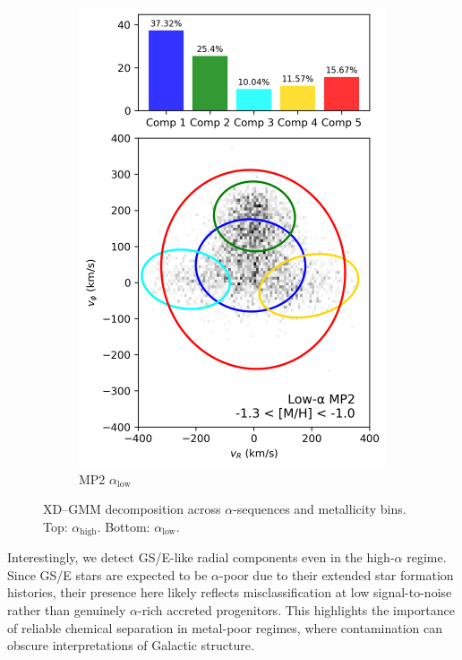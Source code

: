\documentclass[a4paper,10pt]{article}
\begin{document}
\begin{multicols}{2}
\begin{figure}[H]
\begin{subfigure}[t]{0.24\linewidth}
    \includegraphics[width=\linewidth]{../figures/gmm_mp2_low_alpha_k6.png}
    \caption{MP2 $\alpha_{\mathrm{low}}$}
  \end{subfigure}

  \caption{XD–GMM decomposition across $\alpha$-sequences and metallicity bins. Top: $\alpha_{\mathrm{high}}$. Bottom: $\alpha_{\mathrm{low}}$.}
  \label{fig:gmm_alpha_bins}
\end{figure}


Interestingly, we detect GS/E-like radial components even in the high-$\alpha$ regime. 
Since GS/E stars are expected to be $\alpha$-poor due to their extended star formation histories, 
their presence here likely reflects misclassification at low signal-to-noise rather than genuinely 
$\alpha$-rich accreted progenitors. This highlights the importance of reliable chemical 
separation in metal-poor regimes, where contamination can obscure interpretations of Galactic structure.



\end{multicols}
\end{document}
